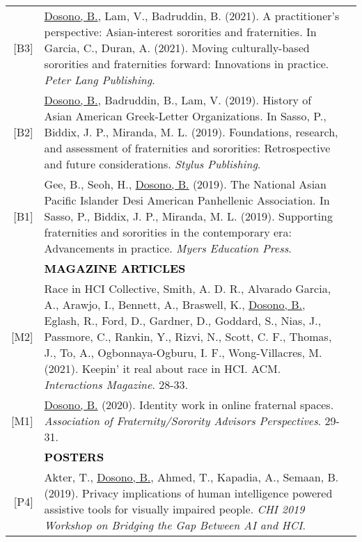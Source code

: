 \documentclass[11pt]{article}
\begin{document}
{{\begin{longtable}{Rp{0.75in}p{5.0in}}
\footnotesize{[B3]} & \href{https://www.google.com/books/edition/Moving_Culturally_Based_Sororities_and_F/XwdXzgEACAAJ}{{Dosono, B.}}, Lam, V., Badruddin, B. (2021). A practitioner's perspective: Asian-interest sororities and fraternities. In Garcia, C., Duran, A. (2021). Moving culturally-based sororities and fraternities forward: Innovations in practice. \textit{Peter Lang Publishing}.\\

\footnotesize{[B2]} & \href{https://books.google.com/books?id=hjDEDwAAQBAJ&pg=PT64}{{Dosono, B.}}, Badruddin, B., Lam, V. (2019). History of Asian American Greek-Letter Organizations. In Sasso, P., Biddix, J. P., Miranda, M. L. (2019). Foundations, research, and assessment of fraternities and sororities: Retrospective and future considerations. \textit{Stylus Publishing}.\\

\footnotesize{[B1]} & Gee, B., Seoh, H., \href{https://www.google.com/books/edition/_/HD1YyAEACAAJ}{{Dosono, B.}} (2019). The National Asian Pacific Islander Desi American Panhellenic Association. In Sasso, P., Biddix, J. P., Miranda, M. L. (2019). Supporting fraternities and sororities in the contemporary era: Advancements in practice. \textit{Myers Education Press}.\\

& \textcolor{black}{\uppercase{\textbf{Magazine Articles}}}\\

\footnotesize{[M2]} & {Race in HCI Collective, Smith, A. D. R., Alvarado Garcia, A., Arawjo, I., Bennett, A., Braswell, K., \href{https://dl.acm.org/doi/10.1145/3477097?cid=88158835957}{Dosono, B.}, Eglash, R., Ford, D., Gardner, D., Goddard, S., Nias, J.,  Passmore, C., Rankin, Y., Rizvi, N., Scott, C. F., Thomas, J., To, A., Ogbonnaya-Ogburu, I. F., Wong-Villacres, M.} (2021). Keepin' it real about race in HCI. ACM. \textit{Interactions Magazine}. 28-33.\\

\footnotesize{[M1]} & \href{https://issuu.com/afa1976/docs/afa-perspectives-2019-issue4-final-nobleed}{{Dosono, B.}} (2020). Identity work in online fraternal spaces. \textit{Association of Fraternity/Sorority Advisors Perspectives}. 29-31.\\

& \textcolor{black}{\uppercase{\textbf{Posters}}}\\

\footnotesize{[P4]} & Akter, T., \href{https://www.usenix.org/sites/default/files/soups2019posters-akter.pdf}{{Dosono, B.}}, Ahmed, T., Kapadia, A., Semaan, B. (2019). Privacy implications of human intelligence powered assistive tools for visually impaired people. \textit{CHI 2019 Workshop on Bridging the Gap Between AI and HCI}.\\


\end{longtable}}}
\end{document}
